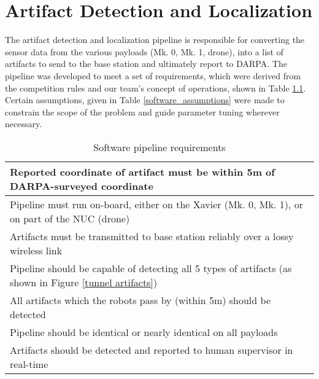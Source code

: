 \chapter{Artifact Detection and Localization}

The artifact detection and localization pipeline is responsible for converting the sensor data from the various payloads (Mk. 0, Mk. 1, drone), into a list of artifacts to send to the base station and ultimately report to DARPA. The pipeline was developed to meet a set of requirements, which were derived from the competition rules and our team's concept of operations, shown in Table \ref{software_requirements}. Certain assumptions, given in Table \ref{software_assumptions} were made to constrain the scope of the problem and guide parameter tuning wherever necessary.

\begin{table}
	\centering
		\begin{adjustbox}{max width=.95\textwidth}
	\begin{tabular}{ |l| } 
	\hline
	Reported coordinate of artifact must be within 5m of DARPA-surveyed coordinate \\ \hline
	Pipeline must run on-board, either on the Xavier (Mk. 0, Mk. 1), or on part of the NUC (drone) \\ \hline
	Artifacts must be transmitted to base station reliably over a lossy wireless link \\  \hline
	Pipeline should be capable of detecting all 5 types of artifacts (as shown in Figure \ref{tunnel artifacts}) \\ \hline
	All artifacts which the robots pass by (within 5m) should be detected \\ \hline
	Pipeline should be identical or nearly identical on all payloads \\ \hline
	Artifacts should be detected and reported to human supervisor in real-time \\ \hline
\end{tabular}
\end{adjustbox}
\caption{Software pipeline requirements}
\label{software_requirements}
\end{table}

